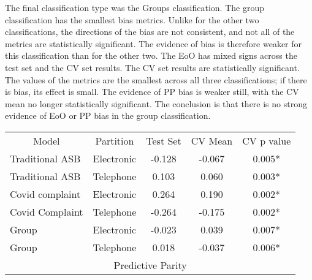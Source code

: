 The final classification type was the Groups classification. The group classification has the smallest bias metrics. Unlike for the other two classifications, the directions of the bias are not consistent, and not all of the metrics are statistically significant. The evidence of bias is therefore weaker for this classification than for the other two. The EoO has mixed signs across the test set and the CV set results. The CV set results are statistically significant. The values of the metrics are the smallest across all three classifications; if there is bias, its effect is small. The evidence of PP bias is weaker still, with the CV mean no longer statistically significant. The conclusion is that there is no strong evidence of EoO or PP bias in the group classification.


\begin{table}[]
\centering
\begin{tabular}{@{}llccc@{}}
\toprule
\rowcolor[HTML]{BFBFBF} 
\multicolumn{5}{c}{\cellcolor[HTML]{BFBFBF}Equality Of Outcome}                                                                             \\ \midrule

\multicolumn{1}{c}{Model} & \multicolumn{1}{c}{Partition} & Test Set & CV Mean & CV p value \\ \midrule
Traditional ASB                                   & Electronic                                            & -0.128   & -0.067  & 0.005*      \\
Traditional ASB                                   & Telephone                                             & 0.103    & 0.060   & 0.003*      \\
Covid complaint                                   & Electronic                                            & 0.264    & 0.190   & 0.002*      \\
Covid Complaint                                   & Telephone                                             & -0.264   & -0.175  & 0.002*      \\
Group                                        & Electronic                                            & -0.023   & 0.039   & 0.007*      \\
Group                                         & Telephone                                             & 0.018    & -0.037  & 0.006*      \\ \midrule
\multicolumn{5}{c}{\cellcolor[HTML]{BFBFBF}Predictive Parity}                                                                                                       \\ \midrule


\end{tabular}
\end{table}
